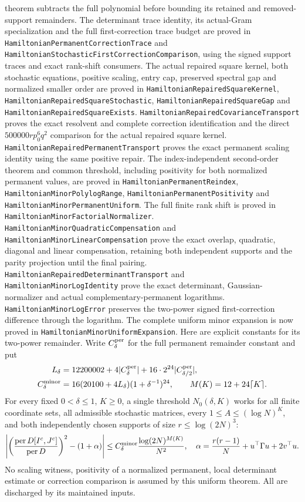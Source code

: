 theorem subtracts the full polynomial before bounding its retained and
removed-support remainders. The determinant trace identity, its
actual-Gram specialization and the full first-correction trace budget
are proved in \texttt{HamiltonianPermanentCorrectionTrace} and
\texttt{HamiltonianStochasticFirstCorrectionComparison}, using the
signed support traces and exact rank-shift consumers.
The actual repaired square kernel, both stochastic equations, positive
scaling, entry cap, preserved spectral gap and normalized smaller order
are proved in \texttt{HamiltonianRepairedSquareKernel},
\texttt{HamiltonianRepairedSquareStochastic},
\texttt{HamiltonianRepairedSquareGap} and
\texttt{HamiltonianRepairedSquareExists}.
\texttt{HamiltonianRepairedCovarianceTransport} proves the exact
resolvent and complete correction identification and the direct
\(500000rp_0^6q^2\) comparison for the actual repaired square kernel.
\texttt{HamiltonianRepairedPermanentTransport} proves the exact
permanent scaling identity using the same positive repair.
The index-independent second-order theorem and common threshold,
including positivity for both normalized permanent values, are proved
in \texttt{HamiltonianPermanentReindex},
\texttt{HamiltonianMinorPolylogRange},
\texttt{HamiltonianPermanentPositivity} and
\texttt{HamiltonianMinorPermanentUniform}.
The full finite rank shift is proved in
\texttt{HamiltonianMinorFactorialNormalizer}.
\texttt{HamiltonianMinorQuadraticCompensation} and
\texttt{HamiltonianMinorLinearCompensation} prove the exact overlap,
quadratic, diagonal and linear compensation, retaining both independent
supports and the parity projection until the final pairing.
\texttt{HamiltonianRepairedDeterminantTransport} and
\texttt{HamiltonianMinorLogIdentity} prove the exact determinant,
Gaussian-normalizer and actual complementary-permanent logarithms.
\texttt{HamiltonianMinorLogError} preserves the two-power signed
first-correction difference through the logarithm.
The complete uniform minor expansion is now proved in
\texttt{HamiltonianMinorUniformExpansion}.
Here are explicit constants for its two-power remainder.
Write \(C_\delta^{\rm per}\) for the full permanent remainder
constant and put
\[
 \begin{split}
 L_\delta={}&12200002+4|C_\delta^{\rm per}|
                  +16\cdot2^{24}|C_{\delta/2}^{\rm per}|,\\
 C_\delta^{\rm minor}={}&16(20100+4L_\delta)(1+\delta^{-1})^{24},
 \qquad M(K)=12+24\lceil K\rceil .
 \end{split}
\]
For every fixed \(0<\delta\leq1\), \(K\geq0\), a single
threshold \(N_0(\delta,K)\) works for all finite coordinate
sets, all admissible stochastic matrices, every
\(1\leq A\leq(\log N)^K\), and both independently chosen
supports of size \(r\leq\log(2N)^3\):
\[
 \left|\left(
 \frac{\operatorname{per}D[I^c,J^c]}{\operatorname{per}D}
          \right)^2-(1+\alpha)\right|
 \leq C_\delta^{\rm minor}\frac{\log(2N)^{M(K)}}{N^2},
 \quad
 \alpha=\frac{r(r-1)}N+u^\top\Gamma u+2v^\top u .
\]
No scaling witness, positivity of a normalized permanent, local
determinant estimate or correction comparison is assumed by this
uniform theorem. All are discharged by its maintained inputs.


